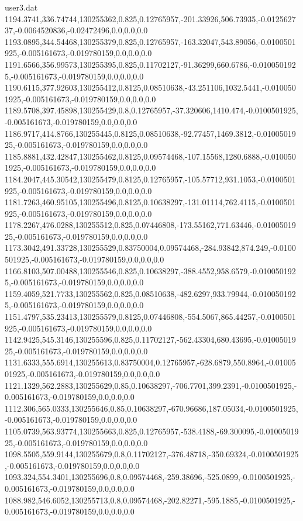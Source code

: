 \begin{filecontents}{user3.dat}
1194.3741,336.74744,130255362,0.825,0.12765957,-201.33926,506.73935,-0.012562737,-0.0064520836,-0.02472496,0.0,0.0,0.0
1193.0895,344.54468,130255379,0.825,0.12765957,-163.32047,543.89056,-0.0100501925,-0.005161673,-0.019780159,0.0,0.0,0.0
1191.6566,356.99573,130255395,0.825,0.11702127,-91.36299,660.6786,-0.0100501925,-0.005161673,-0.019780159,0.0,0.0,0.0
1190.6115,377.92603,130255412,0.8125,0.08510638,-43.251106,1032.5441,-0.0100501925,-0.005161673,-0.019780159,0.0,0.0,0.0
1189.5708,397.45898,130255429,0.8,0.12765957,-37.320606,1410.474,-0.0100501925,-0.005161673,-0.019780159,0.0,0.0,0.0
1186.9717,414.8766,130255445,0.8125,0.08510638,-92.77457,1469.3812,-0.0100501925,-0.005161673,-0.019780159,0.0,0.0,0.0
1185.8881,432.42847,130255462,0.8125,0.09574468,-107.15568,1280.6888,-0.0100501925,-0.005161673,-0.019780159,0.0,0.0,0.0
1184.2047,445.30542,130255479,0.8125,0.12765957,-105.57712,931.1053,-0.0100501925,-0.005161673,-0.019780159,0.0,0.0,0.0
1181.7263,460.95105,130255496,0.8125,0.10638297,-131.01114,762.4115,-0.0100501925,-0.005161673,-0.019780159,0.0,0.0,0.0
1178.2267,476.0288,130255512,0.825,0.07446808,-173.55162,771.63446,-0.0100501925,-0.005161673,-0.019780159,0.0,0.0,0.0
1173.3042,491.33728,130255529,0.83750004,0.09574468,-284.93842,874.249,-0.0100501925,-0.005161673,-0.019780159,0.0,0.0,0.0
1166.8103,507.00488,130255546,0.825,0.10638297,-388.4552,958.6579,-0.0100501925,-0.005161673,-0.019780159,0.0,0.0,0.0
1159.4059,521.7733,130255562,0.825,0.08510638,-482.6297,933.79944,-0.0100501925,-0.005161673,-0.019780159,0.0,0.0,0.0
1151.4797,535.23413,130255579,0.8125,0.07446808,-554.5067,865.44257,-0.0100501925,-0.005161673,-0.019780159,0.0,0.0,0.0
1142.9425,545.3146,130255596,0.825,0.11702127,-562.43304,680.43695,-0.0100501925,-0.005161673,-0.019780159,0.0,0.0,0.0
1131.6333,555.6914,130255613,0.83750004,0.12765957,-628.6879,550.8964,-0.0100501925,-0.005161673,-0.019780159,0.0,0.0,0.0
1121.1329,562.2883,130255629,0.85,0.10638297,-706.7701,399.2391,-0.0100501925,-0.005161673,-0.019780159,0.0,0.0,0.0
1112.306,565.0333,130255646,0.85,0.10638297,-670.96686,187.05034,-0.0100501925,-0.005161673,-0.019780159,0.0,0.0,0.0
1105.0739,563.93774,130255663,0.825,0.12765957,-538.4188,-69.300095,-0.0100501925,-0.005161673,-0.019780159,0.0,0.0,0.0
1098.5505,559.9144,130255679,0.8,0.11702127,-376.48718,-350.69324,-0.0100501925,-0.005161673,-0.019780159,0.0,0.0,0.0
1093.324,554.3401,130255696,0.8,0.09574468,-259.38696,-525.0899,-0.0100501925,-0.005161673,-0.019780159,0.0,0.0,0.0
1088.982,546.6052,130255713,0.8,0.09574468,-202.82271,-595.1885,-0.0100501925,-0.005161673,-0.019780159,0.0,0.0,0.0

\end{filecontents}
